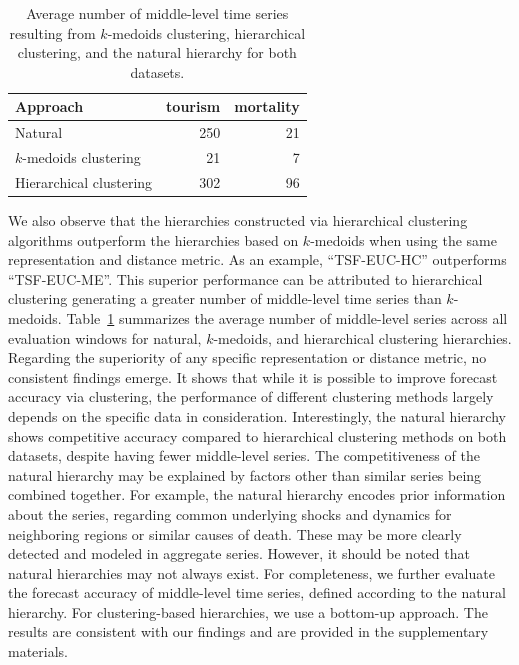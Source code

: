 \documentclass[a4paper,review,12pt,authoryear]{elsarticle}
\begin{document}
\begin{table}[h!]
    \centering
    \caption{\label{tab:P3_number_series}Average number of middle-level time series resulting from $k$-medoids clustering, hierarchical clustering, and the natural hierarchy for both datasets.}
    \begin{tabular}{lrr}
    \toprule
        Approach &  tourism& mortality \\ \midrule
     Natural &250  & 21 \\ 
        $k$-medoids clustering &  21&  7\\ 
        Hierarchical clustering &302   & 96\\ \bottomrule
    \end{tabular}
\end{table}

We also observe that the hierarchies constructed via hierarchical clustering algorithms outperform the hierarchies based on $k$-medoids when using the same representation and distance metric. As an example, ``TSF-EUC-HC'' outperforms ``TSF-EUC-ME''.
This superior performance can be attributed to hierarchical clustering generating a greater number of middle-level time series than $k$-medoids.
Table~\ref{tab:P3_number_series} summarizes the average number of middle-level series across all evaluation windows for natural, $k$-medoids, and hierarchical clustering hierarchies. Regarding the superiority of any specific representation or distance metric, no consistent findings emerge. It shows that while it is possible to improve forecast accuracy via clustering, the performance of different clustering methods largely depends on the specific data in consideration.
Interestingly, the natural hierarchy shows competitive accuracy compared to hierarchical clustering methods on both datasets, despite having fewer middle-level series. {\color{purple} The competitiveness of the natural hierarchy may be explained by factors other than similar series being combined together. For example, the natural hierarchy encodes prior information about the series, regarding common underlying shocks and dynamics for neighboring regions or similar causes of death. These may be more clearly detected and modeled in aggregate series.} However, it should be noted that natural hierarchies may not always exist. {\color{purple} For completeness, we further evaluate the forecast accuracy of middle-level time series, defined according to the natural hierarchy. For clustering-based hierarchies, we use a bottom-up approach. The results are consistent with our findings and are provided in the supplementary materials. } 
\end{document}
